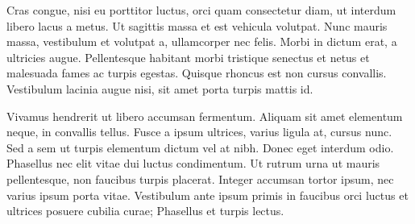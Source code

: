 Cras congue, nisi eu porttitor luctus, orci quam consectetur diam, ut interdum libero lacus a metus. Ut sagittis massa et est vehicula volutpat. Nunc mauris massa, vestibulum et volutpat a, ullamcorper nec felis. Morbi in dictum erat, a ultricies augue. Pellentesque habitant morbi tristique senectus et netus et malesuada fames ac turpis egestas. Quisque rhoncus est non cursus convallis. Vestibulum lacinia augue nisi, sit amet porta turpis mattis id.

Vivamus hendrerit ut libero accumsan fermentum. Aliquam sit amet elementum neque, in convallis tellus. Fusce a ipsum ultrices, varius ligula at, cursus nunc. Sed a sem ut turpis elementum dictum vel at nibh. Donec eget interdum odio. Phasellus nec elit vitae dui luctus condimentum. Ut rutrum urna ut mauris pellentesque, non faucibus turpis placerat. Integer accumsan tortor ipsum, nec varius ipsum porta vitae. Vestibulum ante ipsum primis in faucibus orci luctus et ultrices posuere cubilia curae; Phasellus et turpis lectus.
